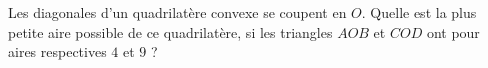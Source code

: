 Les diagonales d'un quadrilatère convexe se coupent en $O$. Quelle est la plus petite aire possible de ce quadrilatère, si les triangles $AOB$ et $COD$ ont pour aires respectives $4$ et $9$ ?
